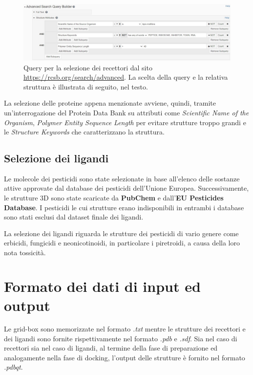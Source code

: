 \begin{figure}
    \centering
    \includegraphics[scale=0.45]{images/rcsb_query.jpg}
    \caption[Query per la selezione dei recettori.]{Query per la selezione dei recettori dal sito \url{https://rcsb.org/search/advanced}. La scelta della query e la relativa struttura è illustrata di seguito, nel testo.}
    \label{fig:rcsb_query}
\end{figure}

La selezione delle proteine appena menzionate avviene, quindi, tramite un'interrogazione del Protein Data Bank su attributi come \textit{Scientific Name of the Organism}, \textit{Polymer Entity Sequence Length} per evitare strutture troppo grandi e le \textit{Structure Keywords} che caratterizzano la struttura.

\subsection{Selezione dei ligandi}
Le molecole dei pesticidi sono state selezionate in base all'elenco delle sostanze attive approvate dal database dei pesticidi dell'Unione Europea. Successivamente, le strutture 3D sono state scaricate da \textbf{PubChem} e dall'\textbf{EU Pesticides Database}. 
I pesticidi le cui strutture erano indisponibili in entrambi i database sono stati esclusi dal dataset finale dei ligandi.

La selezione dei ligandi riguarda le strutture dei pesticidi di vario genere come erbicidi, fungicidi e neonicotinoidi, in particolare i piretroidi, a causa della loro nota tossicità.  


\section{Formato dei dati di input ed output}
Le grid-box sono memorizzate nel formato \textit{.txt} mentre le strutture dei recettori e dei ligandi sono fornite rispettivamente nel formato \textit{.pdb} e \textit{.sdf}.
Sia nel caso di recettori sia nel caso di ligandi, al termine della fase di preparazione ed analogamente nella fase di docking, l'output delle strutture è fornito nel formato \textit{.pdbqt}.


